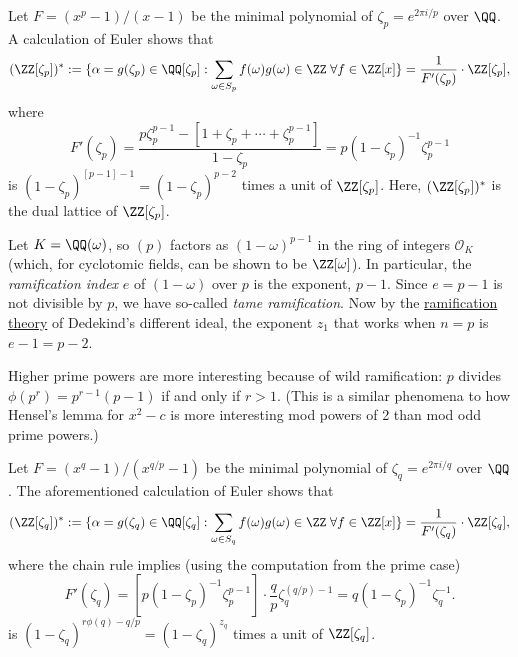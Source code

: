 \documentclass[11pt]{scrartcl}
\begin{document}
\begin{remark*}
Let $F = (x^p - 1)/(x-1)$ be the minimal polynomial of $\zeta_p = e^{2\pi i/p}$ over $\QQ$.
A calculation of Euler shows that
\[
(\ZZ[\zeta_p])^*
:= \{\alpha = g(\zeta_p)\in \QQ[\zeta_p]: \sum_{\omega \in S_p}
f(\omega)g(\omega)\in \ZZ\; \forall f\in \ZZ[x]\}
= \frac{1}{F'(\zeta_p)}\cdot \ZZ[\zeta_p],
\]
where
\[
F'(\zeta_p) = \frac{p\zeta_p^{p-1} - [1+\zeta_p+\dotsb+\zeta_p^{p-1}]}{1-\zeta_p} = p(1-\zeta_p)^{-1}\zeta_p^{p-1}
\]
is $(1-\zeta_p)^{[p-1]-1} = (1-\zeta_p)^{p-2}$ times a unit of
$\ZZ[\zeta_p]$. Here, $(\ZZ[\zeta_p])^*$ is the dual lattice of
$\ZZ[\zeta_p]$.
\end{remark*}


\begin{remark*}
Let $K = \QQ(\omega)$, so $(p)$ factors as $(1-\omega)^{p-1}$ in the ring of integers $\mathcal{O}_K$ (which, for cyclotomic fields, can be shown to be $\ZZ[\omega]$).
In particular, the \emph{ramification index} $e$ of $(1-\omega)$ over $p$ is the exponent, $p-1$.
Since $e = p-1$ is not divisible by $p$, we have so-called \emph{tame ramification}.
Now by the
\href{https://en.wikipedia.org/wiki/Different_ideal\#Ramification}{ramification
theory} of Dedekind's different ideal, the exponent $z_1$ that works when $n=p$ is $e-1 = p-2$.

Higher prime powers are more interesting because of wild ramification: $p$ divides $\phi(p^r) = p^{r-1}(p-1)$ if and only if $r>1$.
(This is a similar phenomena to how Hensel's lemma for $x^2 - c$ is more interesting mod powers of 2 than mod odd prime powers.)
\end{remark*}

\begin{remark*}
Let $F = (x^q - 1)/(x^{q/p}-1)$ be the minimal polynomial of $\zeta_q = e^{2\pi i/q}$ over $\QQ$.
The aforementioned calculation of Euler shows that
\[
(\ZZ[\zeta_q])^*
:= \{\alpha = g(\zeta_q)\in \QQ[\zeta_q]: \sum_{\omega \in S_q}
f(\omega)g(\omega)\in \ZZ \; \forall f\in \ZZ[x]\}
= \frac{1}{F'(\zeta_q)}\cdot \ZZ[\zeta_q],
\]
where the chain rule implies (using the computation from the prime case)
\[
F'(\zeta_q) = [p(1-\zeta_p)^{-1}\zeta_p^{p-1}]\cdot \frac{q}{p}\zeta_q^{(q/p) - 1} = q(1-\zeta_p)^{-1}\zeta_q^{-1}.
\]
is $(1-\zeta_q)^{r\phi(q) - q/p} = (1-\zeta_q)^{z_q}$ times a unit of $\ZZ[\zeta_q]$.
\end{remark*}

\pagebreak
\pagebreak
\end{document}
